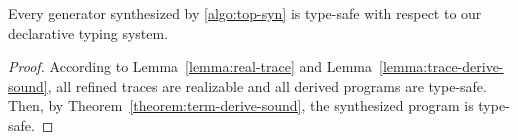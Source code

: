 \begin{theorem}
  \label{theorem:algo-sound-ap}
  Every generator synthesized by \autoref{algo:top-syn} is type-safe
  with respect to our declarative typing system.
\end{theorem}
\begin{proof}
  According to Lemma~\ref{lemma:real-trace} and Lemma~\ref{lemma:trace-derive-sound}, all refined traces are realizable and all derived programs are type-safe. Then, by Theorem~\ref{theorem:term-derive-sound}, the synthesized program is type-safe.
\end{proof}
